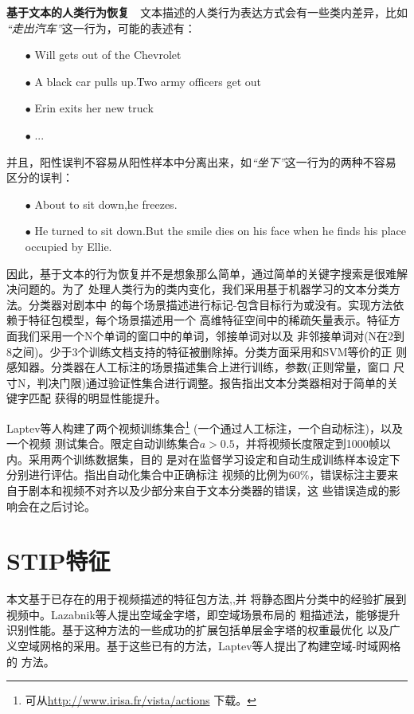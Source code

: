 \textbf{基于文本的人类行为恢复}~~文本描述的人类行为表达方式会有一些类内差异，比如
\textit{``走出汽车''}这一行为，可能的表述有：
\begin{enumerate}
    \item[$\bullet$] Will gets out of the Chevrolet
    \item[$\bullet$] A black car pulls up.Two army officers get out
    \item[$\bullet$] Erin exits her new truck
    \item[$\bullet$] ...
\end{enumerate}
并且，阳性误判不容易从阳性样本中分离出来，如\textit{``坐下''}这一行为的两种不容易
区分的误判：
\begin{enumerate}
    \item[$\bullet$] About to sit down,he freezes.
    \item[$\bullet$] He turned to sit down.But the smile dies on his face when he finds
        his place occupied by Ellie.
\end{enumerate}
因此，基于文本的行为恢复并不是想象那么简单，通过简单的关键字搜索是很难解决问题的。为了
处理人类行为的类内变化，我们采用基于机器学习的文本分类方法\cite{kth}。分类器对剧本中
的每个场景描述进行标记-包含目标行为或没有。实现方法依赖于特征包模型\cite{bof}，每个场景描述用一个
高维特征空间中的稀疏矢量表示。特征方面我们采用一个N个单词的窗口中的单词，邻接单词对以及
非邻接单词对(N在2到8之间)。少于3个训练文档支持的特征被删除掉。分类方面采用和SVM等价的正
则感知器\cite{motioncate}。分类器在人工标注的场景描述集合上进行训练，参数(正则常量，窗口
尺寸N，判决门限)通过验证性集合进行调整。\cite{stip}报告指出文本分类器相对于简单的关键字匹配
获得的明显性能提升。

Laptev等人\cite{stip}构建了两个视频训练集合\footnote{可从\url{http://www.irisa.fr/vista/actions}
下载。}
(一个通过人工标注，一个自动标注)，以及一个视频
测试集合。限定自动训练集合$a>0.5$，并将视频长度限定到1000帧以内。采用两个训练数据集，目的
是对在监督学习设定和自动生成训练样本设定下分别进行评估。\cite{stip}指出自动化集合中正确标注
视频的比例为$60\%$，错误标注主要来自于剧本和视频不对齐以及少部分来自于文本分类器的错误，这
些错误造成的影响会在之后讨论。

\section{STIP特征}
本文基于已存在的用于视频描述的特征包方法\cite{webimage},\cite{objectrepresent},\cite{sstf}并
将静态图片分类中的经验扩展到视频中。Lazabnik等人\cite{bbof}提出空域金字塔，即空域场景布局的
粗描述法，能够提升识别性能。基于这种方法的一些成功的扩展包括单层金字塔的权重最优化\cite{spk}
以及广义空域网格\cite{rtdv}的采用。基于这些已有的方法，Laptev等人提出了构建空域-时域网格的
方法\cite{stip}。

